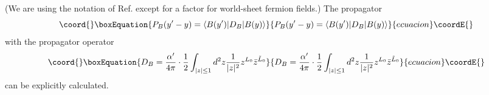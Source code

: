 \documentclass[a4paper,prd,preprint]{revtex4}
\begin{document}
(We are using the notation of Ref.\cite{Polchinski}
 except for a factor \coordHE{} for world-sheet fermion fields.)
The propagator
\begin{equation}\coord{}\boxEquation{
 P_B(y'-y) = \langle B(y') | D_B | B(y) \rangle
}{
 P_B(y'-y) = \langle B(y') | D_B | B(y) \rangle
}{ecuacion}\coordE{}\end{equation}
 with the propagator operator
\begin{equation}\coord{}\boxEquation{
 D_B = {{\alpha'} \over {4\pi}} \cdot {1 \over 2}
       \int_{|z| \le 1} d^2z {1 \over {|z|^2}}
       z^{L_0} {\bar z}^{{\tilde L}_0}
}{
 D_B = {{\alpha'} \over {4\pi}} \cdot {1 \over 2}
       \int_{|z| \le 1} d^2z {1 \over {|z|^2}}
       z^{L_0} {\bar z}^{{\tilde L}_0}
}{ecuacion}\coordE{}\end{equation}
 can be explicitly calculated.
\end{document}
